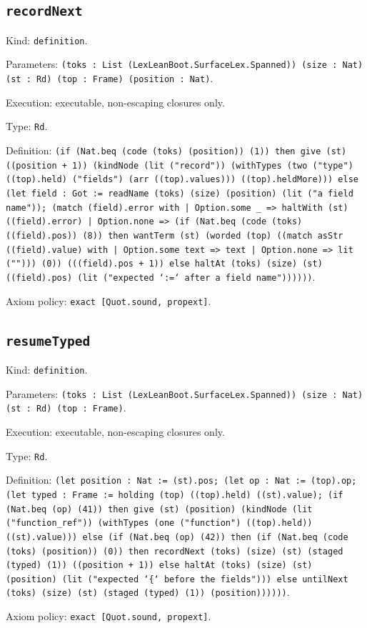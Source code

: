 \documentclass[11pt]{article}
\begin{document}
\subsection*{\texttt{recordNext}}
\noindent Kind: \texttt{definition}.\par
\noindent Parameters: \texttt{(toks : List (LexLeanBoot.SurfaceLex.Spanned)) (size : Nat) (st : Rd) (top : Frame) (position : Nat)}.\par
\noindent Execution: executable, non-escaping closures only.\par
\noindent Type: \texttt{Rd}.\par
\noindent Definition: \texttt{(if (Nat.beq (code (toks) (position)) (1)) then give (st) ((position + 1)) (kindNode (lit ("record")) (withTypes (two ("type") ((top).held) ("fields") (arr ((top).values))) ((top).heldMore))) else (let field : Got := readName (toks) (size) (position) (lit ("a field name")); (match (field).error with | Option.some \_ => haltWith (st) ((field).error) | Option.none => (if (Nat.beq (code (toks) ((field).pos)) (8)) then wantTerm (st) (worded (top) ((match asStr ((field).value) with | Option.some text => text | Option.none => lit (""))) (0)) (((field).pos + 1)) else haltAt (toks) (size) (st) ((field).pos) (lit ("expected `:=` after a field name"))))))}.\par
\noindent Axiom policy: \texttt{exact [Quot.sound, propext]}.\par
\subsection*{\texttt{resumeTyped}}
\noindent Kind: \texttt{definition}.\par
\noindent Parameters: \texttt{(toks : List (LexLeanBoot.SurfaceLex.Spanned)) (size : Nat) (st : Rd) (top : Frame)}.\par
\noindent Execution: executable, non-escaping closures only.\par
\noindent Type: \texttt{Rd}.\par
\noindent Definition: \texttt{(let position : Nat := (st).pos; (let op : Nat := (top).op; (let typed : Frame := holding (top) ((top).held) ((st).value); (if (Nat.beq (op) (41)) then give (st) (position) (kindNode (lit ("function\_ref")) (withTypes (one ("function") ((top).held)) ((st).value))) else (if (Nat.beq (op) (42)) then (if (Nat.beq (code (toks) (position)) (0)) then recordNext (toks) (size) (st) (staged (typed) (1)) ((position + 1)) else haltAt (toks) (size) (st) (position) (lit ("expected `\{` before the fields"))) else untilNext (toks) (size) (st) (staged (typed) (1)) (position))))))}.\par
\noindent Axiom policy: \texttt{exact [Quot.sound, propext]}.\par
\end{document}
